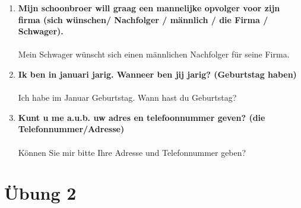 \documentclass[main.tex]{subfiles}
\begin{document}
\begin{enumerate}
\\
\item \textbf{Mijn schoonbroer will graag een mannelijke opvolger voor zijn firma (sich wünschen/ Nachfolger / männlich / die Firma / Schwager).}\\ \\
Mein Schwager wünscht sich einen männlichen Nachfolger für seine Firma.
\\
\item \textbf{Ik ben in januari jarig. Wanneer ben jij jarig? (Geburtstag haben)} \\ \\
Ich habe im Januar Geburtstag. Wann hast du Geburtstag?
\\
\item \textbf{Kunt u me a.u.b. uw adres en telefoonnummer geven? (die Telefonnummer/Adresse)} \\ \\
Können Sie mir bitte Ihre Adresse und Telefonnummer geben?

\end{enumerate}
\pagebreak
\section{Übung 2}
\end{document}
